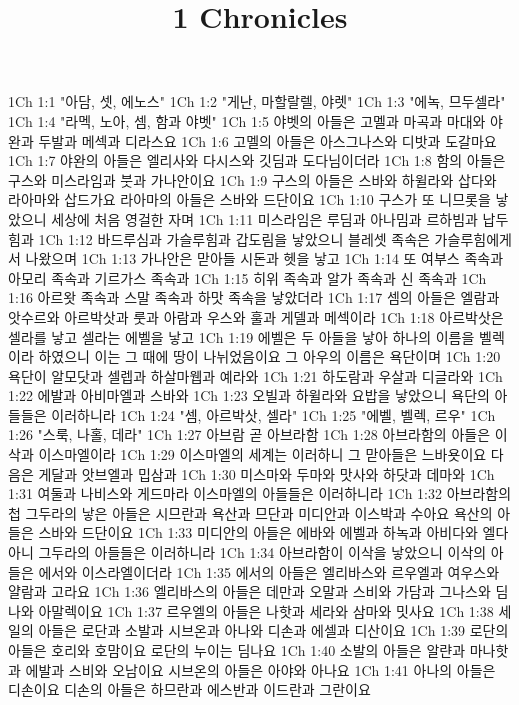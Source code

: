 

\title{1 Chronicles}

1Ch 1:1  "아담, 셋, 에노스"
1Ch 1:2  "게난, 마할랄렐, 야렛"
1Ch 1:3  "에녹, 므두셀라"
1Ch 1:4  "라멕, 노아, 셈, 함과 야벳"
1Ch 1:5  야벳의 아들은 고멜과 마곡과 마대와 야완과 두발과 메섹과 디라스요
1Ch 1:6  고멜의 아들은 아스그나스와 디밧과 도갈마요
1Ch 1:7  야완의 아들은 엘리사와 다시스와 깃딤과 도다님이더라
1Ch 1:8  함의 아들은 구스와 미스라임과 붓과 가나안이요
1Ch 1:9  구스의 아들은 스바와 하윌라와 삽다와 라아마와 삽드가요 라아마의 아들은 스바와 드단이요
1Ch 1:10  구스가 또 니므롯을 낳았으니 세상에 처음 영걸한 자며
1Ch 1:11  미스라임은 루딤과 아나밈과 르하빔과 납두힘과
1Ch 1:12  바드루심과 가슬루힘과 갑도림을 낳았으니 블레셋 족속은 가슬루힘에게서 나왔으며
1Ch 1:13  가나안은 맏아들 시돈과 헷을 낳고
1Ch 1:14  또 여부스 족속과 아모리 족속과 기르가스 족속과
1Ch 1:15  히위 족속과 알가 족속과 신 족속과
1Ch 1:16  아르왓 족속과 스말 족속과 하맛 족속을 낳았더라
1Ch 1:17  셈의 아들은 엘람과 앗수르와 아르박삿과 룻과 아람과 우스와 훌과 게델과 메섹이라
1Ch 1:18  아르박삿은 셀라를 낳고 셀라는 에벨을 낳고
1Ch 1:19  에벨은 두 아들을 낳아 하나의 이름을 벨렉이라 하였으니 이는 그 때에 땅이 나뉘었음이요 그 아우의 이름은 욕단이며
1Ch 1:20  욕단이 알모닷과 셀렙과 하살마웹과 예라와
1Ch 1:21  하도람과 우살과 디글라와
1Ch 1:22  에발과 아비마엘과 스바와
1Ch 1:23  오빌과 하윌라와 요밥을 낳았으니 욕단의 아들들은 이러하니라
1Ch 1:24  "셈, 아르박삿, 셀라"
1Ch 1:25  "에벨, 벨렉, 르우"
1Ch 1:26  "스룩, 나홀, 데라"
1Ch 1:27  아브람 곧 아브라함
1Ch 1:28  아브라함의 아들은 이삭과 이스마엘이라
1Ch 1:29  이스마엘의 세계는 이러하니 그 맏아들은 느바욧이요 다음은 게달과 앗브엘과 밉삼과
1Ch 1:30  미스마와 두마와 맛사와 하닷과 데마와
1Ch 1:31  여둘과 나비스와 게드마라 이스마엘의 아들들은 이러하니라
1Ch 1:32  아브라함의 첩 그두라의 낳은 아들은 시므란과 욕산과 므단과 미디안과 이스박과 수아요 욕산의 아들은 스바와 드단이요
1Ch 1:33  미디안의 아들은 에바와 에벨과 하녹과 아비다와 엘다아니 그두라의 아들들은 이러하니라
1Ch 1:34  아브라함이 이삭을 낳았으니 이삭의 아들은 에서와 이스라엘이더라
1Ch 1:35  에서의 아들은 엘리바스와 르우엘과 여우스와 얄람과 고라요
1Ch 1:36  엘리바스의 아들은 데만과 오말과 스비와 가담과 그나스와 딤나와 아말렉이요
1Ch 1:37  르우엘의 아들은 나핫과 세라와 삼마와 밋사요
1Ch 1:38  세일의 아들은 로단과 소발과 시브온과 아나와 디손과 에셀과 디산이요
1Ch 1:39  로단의 아들은 호리와 호맘이요 로단의 누이는 딤나요
1Ch 1:40  소발의 아들은 알랸과 마나핫과 에발과 스비와 오남이요 시브온의 아들은 아야와 아나요
1Ch 1:41  아나의 아들은 디손이요 디손의 아들은 하므란과 에스반과 이드란과 그란이요

